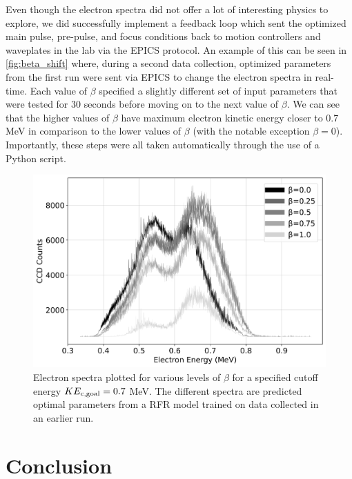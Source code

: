 Even though the electron spectra did not offer a lot of interesting physics to explore, we did successfully implement a feedback loop which sent the optimized main pulse, pre-pulse, and focus conditions back to motion controllers and waveplates in the lab via the \gls{EPICS} protocol. An example of this can be seen in \autoref{fig:beta_shift} where, during a second data collection, optimized parameters from the first run were sent via \gls{EPICS} to change the electron spectra in real-time. Each value of $\beta$ specified a slightly different set of input parameters that were tested for 30 seconds before moving on to the next value of $\beta$. We can see that the higher values of $\beta$ have maximum electron kinetic energy closer to 0.7 MeV in comparison to the lower values of $\beta$ (with the notable exception $\beta=0$). Importantly, these steps were all taken automatically through the use of a Python script.

\begin{figure}
	\centering 
	\includegraphics[width=0.6\linewidth]{planning/images/daq/rf_beta_shift.jpg}
	\caption{Electron spectra plotted for various levels of $\beta$ for a specified cutoff energy $KE_{\rm c,goal} = 0.7$ MeV. The different spectra are predicted optimal parameters from a \gls{RFR} model trained on data collected in an earlier run.}
	\label{fig:beta_shift}
\end{figure}

\section{Conclusion}


